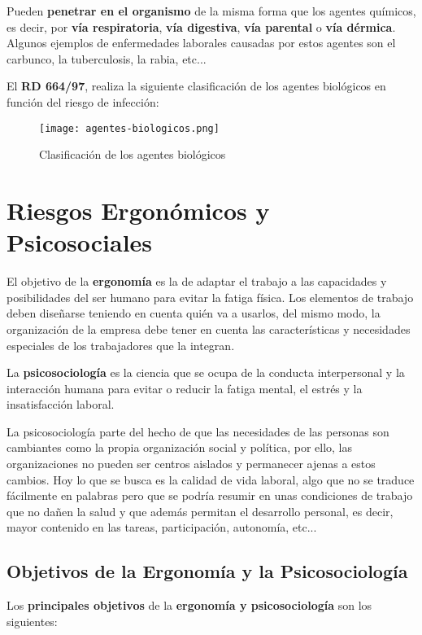 Pueden \textbf{penetrar en el organismo} de la misma forma que los agentes químicos, es decir, por \textbf{vía respiratoria}, \textbf{vía digestiva}, \textbf{vía parental} o \textbf{vía dérmica}. Algunos ejemplos de enfermedades laborales causadas por estos agentes son el carbunco, la tuberculosis, la rabia, etc...

El \textbf{RD 664/97}, realiza la siguiente clasificación de los agentes biológicos en función del riesgo de infección:

\begin{figure}[H]
    \centering
    \texttt{[image: agentes-biologicos.png]}
    \caption{Clasificación de los agentes biológicos}
\end{figure}

\section{Riesgos Ergonómicos y Psicosociales}
El objetivo de la \textbf{ergonomía} es la de adaptar el trabajo a las capacidades y posibilidades del ser humano para evitar la fatiga física. Los elementos de trabajo deben diseñarse teniendo en cuenta quién va a usarlos, del mismo modo, la organización de la empresa debe tener en cuenta las características y necesidades especiales de los trabajadores que la integran.

La \textbf{psicosociología} es la ciencia que se ocupa de la conducta interpersonal y la interacción humana para evitar o reducir la fatiga mental, el estrés y la insatisfacción laboral.

La psicosociología parte del hecho de que las necesidades de las personas son cambiantes como la propia organización social y política, por ello, las organizaciones no pueden ser centros aislados y permanecer ajenas a estos cambios. Hoy lo que se busca es la calidad de vida laboral, 	algo que no se traduce fácilmente en palabras pero que se podría resumir en unas condiciones de trabajo que no dañen la salud y que además permitan el desarrollo personal, es decir, mayor contenido en las tareas, participación, autonomía, etc...

\subsection{Objetivos de la Ergonomía y la Psicosociología}

Los \textbf{principales objetivos} de la \textbf{ergonomía y psicosociología} son los siguientes:

